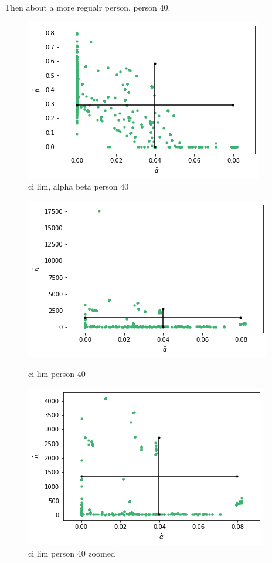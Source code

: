 Then about a more regualr person, person 40. 
\begin{figure}
    \centering
    \includegraphics[scale=0.5]{pictures/ci_lim_a_b_person40.png}
    \caption{ci lim, alpha beta person 40}
    \label{fig:ci_lim_a_b_person40}
\end{figure}


\begin{figure}
    \centering
    \begin{minipage}{0.48\textwidth}
        \centering
        \includegraphics[scale=0.37]{pictures/ci_lim_a_e_person40.png}
        \caption{ci lim person 40}
        \label{fig:ci_lim_a_e_person_40}
    \end{minipage}\hfill
    \begin{minipage}{0.48\textwidth}
        \centering
        \includegraphics[scale=0.37]{pictures/ci_lim_a_e_person40_zoomed.png}
        \caption{ci lim person 40 zoomed}
        \label{fig:ci_lim_a_e_person_40_zoomed}
    \end{minipage}
\end{figure}



